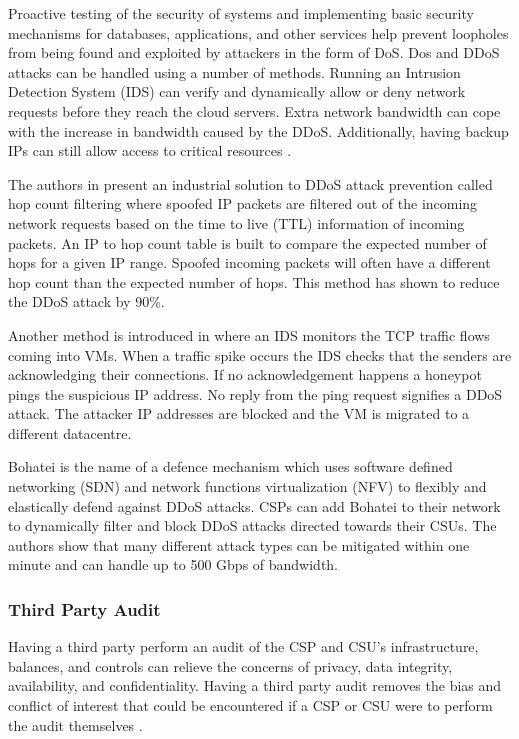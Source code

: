 \documentclass[12pt]{article}
\begin{document}
Proactive testing of the security of systems and implementing basic security mechanisms for databases, applications, and other services help prevent loopholes from being found and exploited by attackers in the form of DoS. Dos and DDoS attacks can be handled using a number of methods. Running an Intrusion Detection System (IDS) can verify and dynamically allow or deny network requests before they reach the cloud servers. Extra network bandwidth can cope with the increase in bandwidth caused by the DDoS. Additionally, having backup IPs can still allow access to critical resources \cite{kazim2015survey}.

The authors in \cite{jin2003hop} present an industrial solution to DDoS attack prevention called hop count filtering where spoofed IP packets are filtered out of the incoming network requests based on the time to live (TTL) information of incoming packets. An IP to hop count table is built to compare the expected number of hops for a given IP range. Spoofed incoming packets will often have a different hop count than the expected number of hops. This method has shown to reduce the DDoS attack by 90\%.

Another method is introduced in \cite{bakshi2010securing} where an IDS monitors the TCP traffic flows coming into VMs. When a traffic spike occurs the IDS checks that the senders are acknowledging their connections. If no acknowledgement happens a honeypot pings the suspicious IP address. No reply from the ping request signifies a DDoS attack. The attacker IP addresses are blocked and the VM is migrated to a different datacentre.

Bohatei \cite{fayaz2015bohatei} is the name of a defence mechanism which uses software defined networking (SDN) and network functions virtualization (NFV) to flexibly and elastically defend against DDoS attacks. CSPs can add Bohatei to their network to dynamically filter and block DDoS attacks directed towards their CSUs. The authors show that many different attack types can be mitigated within one minute and can handle up to 500 Gbps of bandwidth.


\subsubsection{Third Party Audit}

Having a third party perform an audit of the CSP and CSU's infrastructure, balances, and controls can relieve the concerns of privacy, data integrity, availability, and confidentiality. Having a third party audit removes the bias and conflict of interest that could be encountered if a CSP or CSU were to perform the audit themselves \cite{liu2015survey}.
\end{document}
